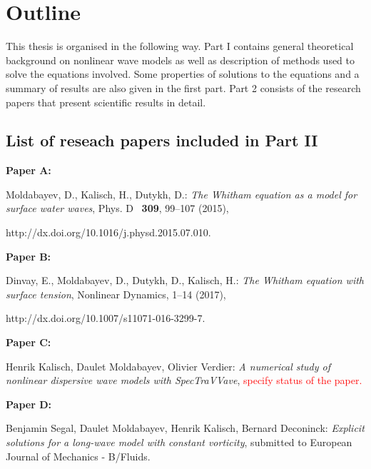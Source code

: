 \chapter{Outline}



This thesis is organised in the following way. Part I contains general theoretical background on nonlinear wave models as well as description of methods used to solve the equations involved. Some properties of solutions to the equations and a summary of results are also given in the first part. Part 2 consists of the research papers that present scientific results in detail. 



\section*{List of reseach papers included in Part II}


\textbf{Paper A:}

\noindent Moldabayev, D., Kalisch, H., Dutykh, D.: \textit{The Whitham equation as a model for surface water waves}, Phys. D~ \textbf{309}, 99–107 (2015),  

\noindent http://dx.doi.org/10.1016/j.physd.2015.07.010.

\vspace{1em}

\noindent \textbf{Paper B:}

\noindent Dinvay, E., Moldabayev, D., Dutykh, D., Kalisch, H.:  \textit{The Whitham equation with surface tension}, Nonlinear Dynamics, 1--14 (2017),  

\noindent http://dx.doi.org/10.1007/s11071-016-3299-7.

\vspace{1em}

\noindent \textbf{Paper C:}

\noindent Henrik Kalisch, Daulet Moldabayev, Olivier Verdier: \textit{A numerical study of nonlinear dispersive wave models with SpecTraVVave}, \textcolor{red}{specify status of the paper.}

\vspace{1em}

\noindent \textbf{Paper D:}

\noindent Benjamin Segal, Daulet Moldabayev, Henrik Kalisch, Bernard Deconinck: \textit{Explicit solutions for a long-wave model with constant vorticity}, submitted to European Journal of Mechanics - B/Fluids.
